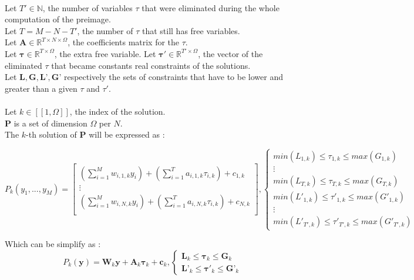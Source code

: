 \documentclass{article}
\begin{document}
\\
Let $T' \in \mathbb{N}$, the number of variables $\tau$ that were eliminated during the whole computation of the preimage. \\
Let $T = M-N-T'$, the number of $\tau$ that still has free variables.\\
Let $\textbf{A} \in \mathbb{R}^{T \times N \times \Omega}$, the coefficients matrix for the $\tau$.\\
Let $\boldsymbol{\tau} \in \mathbb{R}^{T \times \Omega}$, the extra free variable.
Let $\boldsymbol{\tau}' \in \mathbb{R}^{T' \times \Omega}$, the vector of the eliminated $\tau$ that became constants real constraints of the solutions.\\
Let $\textbf{L},\textbf{G},\textbf{L'},\textbf{G'}$ respectively the sets of constraints that have to be lower and greater than a given $\tau$ and $\tau'$.\\
\\
Let  $k \in [\![1,\Omega]\!]$, the index of the solution.\\
$\textbf{P}$ is a set of dimension $\Omega$ per $N$.\\
The $k$-th solution of $\textbf{P}$  will be expressed as : 

\begin{equation*}
P_{k}(y_{1},...,y_{M})=
\begin{bmatrix}
(\sum_{i=1}^{M} w_{i,1,k}y_{i} )+ (\sum_{i=1}^{T} a_{i,1,k}\tau_{i,k}) + c_{1,k} \\
\vdots \\
(\sum_{i=1}^{M} w_{i,N,k}y_{i} )+ (\sum_{i=1}^{T} a_{i,N,k}\tau_{i,k}) + c_{N,k}  \\
\end{bmatrix}
,
\begin{cases}
    min(L_{1,k})  \leqslant \tau_{1,k} \leqslant max(G_{1,k})\\
    \vdots   \\
    min(L_{T,k})  \leqslant \tau_{T,k} \leqslant max(G_{T,k})\\
    min(L'_{1,k})  \leqslant\tau'_{1,k} \leqslant max(G'_{1,k})\\
    \vdots   \\
    min(L'_{T',k})  \leqslant \tau'_{T',k} \leqslant max(G'_{T',k})
\end{cases}
\end{equation*}

Which can be simplify as :
\begin{equation*}
    P_{k}(\textbf{y})= \textbf{W}_{k}\textbf{y} + \textbf{A}_{k}\boldsymbol{\tau}_{k} + \textbf{c}_{k},
    \begin{cases}
        \textbf{L}_{k}  \leqslant \boldsymbol{\tau}_{k} \leqslant \textbf{G}_{k}\\
        \textbf{L'}_{k}  \leqslant \boldsymbol{\tau'}_{k} \leqslant \textbf{G'}_{k}
    \end{cases}
\end{equation*}
\end{document}
